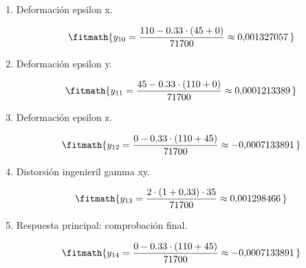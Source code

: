 \begin{enumerate}
\[\fitmath{y_{9}=-\left(\frac{110-45}{2}\right)\cdot \sin\left(\frac{2\cdot \pi\cdot 45}{180}\right)+35\cdot \cos\left(\frac{2\cdot \pi\cdot 45}{180}\right)\approx -32{,}5\,\mathrm{MPa}}\]

\item Deformación epsilon x.

\[\fitmath{y_{10}=\frac{110-0.33\cdot \left(45+0\right)}{71700}\approx 0{,}001327057\,}\]

\item Deformación epsilon y.

\[\fitmath{y_{11}=\frac{45-0.33\cdot \left(110+0\right)}{71700}\approx 0{,}0001213389\,}\]

\item Deformación epsilon z.

\[\fitmath{y_{12}=\frac{0-0.33\cdot \left(110+45\right)}{71700}\approx -0{,}0007133891\,}\]

\item Distorsión ingenieril gamma xy.

\[\fitmath{y_{13}=\frac{2\cdot \left(1+0{,}33\right)\cdot 35}{71700}\approx 0{,}001298466\,}\]

\item Respuesta principal: comprobación final.

\[\fitmath{y_{14}=\frac{0-0.33\cdot \left(110+45\right)}{71700}\approx -0{,}0007133891\,}\]

\end{enumerate}
